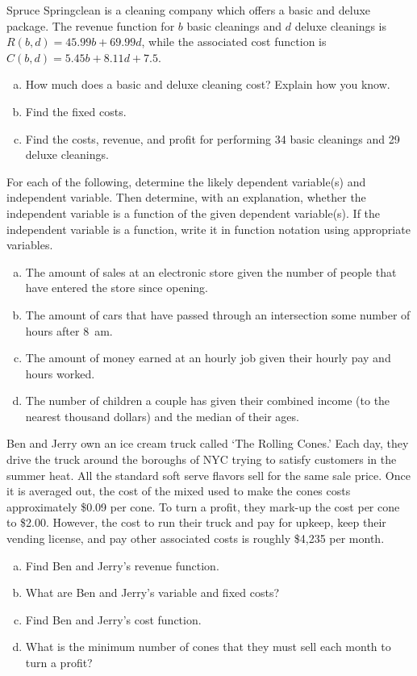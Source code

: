 \documentclass[11pt,letterpaper]{article}
\begin{document}
\prob Spruce Springclean is a cleaning company which offers a basic and deluxe package. The revenue function for $b$ basic cleanings and $d$ deluxe cleanings is $R(b, d)= 45.99b + 69.99d$, while the associated cost function is $C(b, d)= 5.45b + 8.11d + 7.5$. 
	\begin{enumerate}[(a)]
	\item How much does a basic and deluxe cleaning cost? Explain how you know. 
	\item Find the fixed costs.
	\item Find the costs, revenue, and profit for performing 34 basic cleanings and 29 deluxe cleanings. 
	\end{enumerate} \pspace


\prob For each of the following, determine the likely dependent variable(s) and independent variable. Then determine, with an explanation, whether the independent variable is a function of the given dependent variable(s). If the independent variable is a function, write it in function notation using appropriate variables. 
	\begin{enumerate}[(a)]
	\item The amount of sales at an electronic store given the number of people that have entered the store since opening. 
	\item The amount of cars that have passed through an intersection some number of hours after 8~am.
	\item The amount of money earned at an hourly job given their hourly pay and hours worked.
	\item The number of children a couple has given their combined income (to the nearest thousand dollars) and the median of their ages. 
	\end{enumerate} \pspace
	

\prob Ben and Jerry own an ice cream truck called `The Rolling Cones.' Each day, they drive the truck around the boroughs of NYC trying to satisfy customers in the summer heat. All the standard soft serve flavors sell for the same sale price. Once it is averaged out, the cost of the mixed used to make the cones costs approximately \$0.09 per cone. To turn a profit, they mark-up the cost per cone to \$2.00. However, the cost to run their truck and pay for upkeep, keep their vending license, and pay other associated costs is roughly \$4,235 per month. 
	\begin{enumerate}[(a)]
	\item Find Ben and Jerry's revenue function.
	\item What are Ben and Jerry's variable and fixed costs?
	\item Find Ben and Jerry's cost function. 
	\item What is the minimum number of cones that they must sell each month to turn a profit?
	\end{enumerate} \pspace
\end{document}

